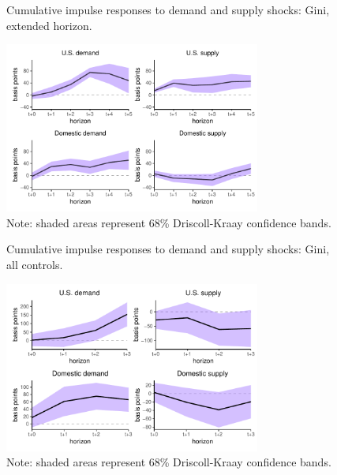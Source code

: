\documentclass[12pt, a4paper]{article}
\begin{document}
\begin{figure}[H]
    \caption{Cumulative impulse responses to demand and supply shocks: Gini, extended horizon.}
    \label{fig:irf_longer}
    \centering
    \includegraphics[width=0.75\textwidth]{Figures/baseline_demand_supply_LP_hor_5.pdf}
    \caption*{Note: shaded areas represent 68\% Driscoll-Kraay confidence bands.}
\end{figure}

\begin{figure}[H]
    \centering
    \caption{Cumulative impulse responses to demand and supply shocks: Gini, all controls.}
    \label{fig:demand_supply_robust}
    \includegraphics[width=0.75\textwidth]{Figures/robust_demand_supply_LP_extended.pdf}
    \centering \caption*{Note: shaded areas represent 68\% Driscoll-Kraay confidence bands.}
\end{figure}
\end{document}
